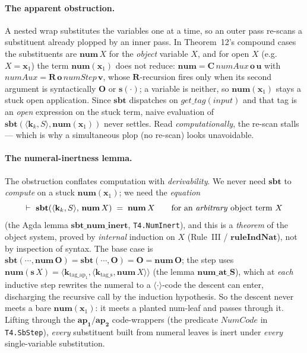 \documentclass[11pt]{article}
\theoremstyle{plain}
\theoremstyle{definition}
\theoremstyle{remark}
\newcommand{\sbt}{\mathbf{sbt}}
\newcommand{\num}{\mathbf{num}}
\newcommand{\seq}[1]{\langle #1 \rangle}
\begin{document}
\paragraph{The apparent obstruction.}  A nested wrap substitutes the
variables one at a time, so an outer pass re-scans a substituent already
plopped by an inner pass.  In Theorem~12's compound cases the substituents
are $\num\,X$ for the \emph{object} variable $X$, and for open $X$ (e.g.\
$X=\mathbf{x}_1$) the term $\num(\mathbf{x}_1)$ does not reduce:
$\num = \mathbf{C}\,\mathit{numAux}\,\mathbf{o}\,\mathbf{u}$ with
$\mathit{numAux}=\mathbf{R}\,\mathbf{o}\,\mathit{numStep}\,\mathbf{v}$, whose
$\mathbf{R}$-recursion fires only when its second argument is syntactically
$\mathbf{O}$ or $\mathbf{s}(\cdot)$; a variable is neither, so
$\num(\mathbf{x}_1)$ stays a stuck open application.  Since $\sbt$ dispatches
on $\mathit{get\_tag}(\mathit{input})$ and that tag is an \emph{open}
expression on the stuck term, naive evaluation of
$\sbt(\seq{\mathbf{k}_k, S}, \num(\mathbf{x}_1))$ never settles.  Read
\emph{computationally}, the re-scan stalls --- which is why a simultaneous
plop (no re-scan) looks unavoidable.

\paragraph{The numeral-inertness lemma.}  The obstruction conflates
computation with \emph{derivability}.  We never need $\sbt$ to \emph{compute}
on a stuck $\num(\mathbf{x}_1)$; we need the \emph{equation}
\[
\vdash\ \sbt(\seq{\mathbf{k}_k, S},\, \num\,X) \;=\; \num\,X
\qquad\text{for an \emph{arbitrary} object term } X
\]
(the Agda lemma $\mathbf{sbt\_num\_inert}$, \verb|T4.NumInert|), and this is
a \emph{theorem} of the object system, proved by \emph{internal} induction on
$X$ (Rule~III / $\mathbf{ruleIndNat}$), not by inspection of syntax.  The
base case is $\sbt(\cdots, \num\,\mathbf{O}) = \sbt(\cdots,\mathbf{O}) =
\mathbf{O} = \num\,\mathbf{O}$; the step uses $\num(\mathbf{s}\,X) =
\seq{\mathbf{k}_{\mathrm{tag\_ap_1}}, \seq{\mathbf{k}_{\mathrm{tag\_s}},
\num\,X}}$ (the lemma $\mathbf{num\_at\_S}$), which at \emph{each} inductive
step rewrites the numeral to a $\seq{\cdot}$-code the descent can enter,
discharging the recursive call by the induction hypothesis.  So the descent
never meets a bare $\num(\mathbf{x}_1)$: it meets a planted num-leaf and
passes through it.  Lifting through the $\mathbf{ap_1}/\mathbf{ap_2}$
code-wrappers (the predicate $\mathit{NumCode}$ in \verb|T4.SbStep|),
\emph{every} substituent built from numeral leaves is inert under
\emph{every} single-variable substitution.
\end{document}
